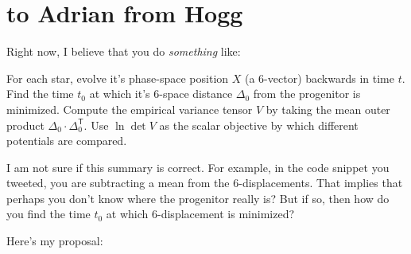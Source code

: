 \documentclass[12pt,letterpaper]{article}
\newcommand{\TT}{{\!\mathsf{T}}}
\begin{document}
\section*{to Adrian from Hogg}

Right now, I believe that you do \emph{something} like:
\begin{blockquote}
For each star,
evolve it's phase-space position $X$ (a 6-vector) backwards in time $t$.
Find the time $t_0$ at which it's 6-space distance $\Delta_0$ from the progenitor is minimized.
Compute the empirical variance tensor $V$ by taking the mean outer product $\Delta_0\cdot \Delta_0^\TT$.
Use $\ln\det V$ as the scalar objective by which different potentials are compared.
\end{blockquote}
I am not sure if this summary is correct.
For example, in the code snippet you tweeted, you are subtracting a mean from the 6-displacements.
That implies that perhaps you don't know where the progenitor really is?
But if so, then how do you find the time $t_0$ at which 6-displacement is minimized?

Here's my proposal:
\end{document}
